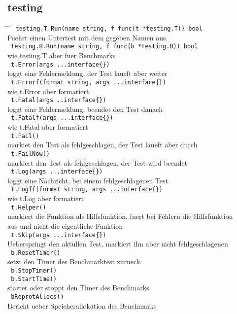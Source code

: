 \documentclass[twoside,a4paper,12pt]{article}
\begin{document}
\subsection{testing}
\begin{tabbing}
 \hspace{2mm} \= \hspace{70mm} \= \kill
 \> \verb| testing.T.Run(name string, f func(t *testing.T)) bool | \\ 
 \> Fuehrt einen Untertest mit dem gegeben Namen aus. \\ 
 \> \verb| testing.B.Run(name string, f func(b *testing.B)) bool | \\ 
 \> wie testing.T aber fuer Benchmarks \\ 
 \> \verb| t.Error(args ...interface{}) | \\ 
 \> loggt eine Fehlermeldung, der Test laueft aber weiter \\ 
 \> \verb| t.Errorf(format string, args ...interface{}) | \\ 
 \> wie t.Error aber formatiert \\ 
 \> \verb| t.Fatal(args ..interface{}) | \\ 
 \> loggt eine Fehlermeldung, beendet den Test danach \\ 
 \> \verb| t.Fatalf(args ...interface{}) | \\ 
 \> wie t.Fatal aber formatiert \\ 
 \> \verb| t.Fail() | \\ 
 \> markiet den Test als fehlgeschlagen, der Test laueft aber durch \\ 
 \> \verb| t.FailNow() | \\ 
 \> markiert den Test als fehlgeschlagen, der Test wird beendet \\ 
 \> \verb| t.Log(args ...interface{}) | \\ 
 \> loggt eine Nachricht, bei einem fehlgeschlagenen Test \\ 
 \> \verb| t.Logff(format string, args ...interface{}) | \\ 
 \> wie t.Log aber formatiert \\ 
 \> \verb| t.Helper() | \\ 
 \> markiert die Funktion als Hilfsfunktion, fuert bei Fehlern die Hilfsfunktion \\ 
 \> aus und nicht die eigentliche Funktion \\ 
 \> \verb| t.Skip(args ...interface{}) | \\ 
 \> Ueberspringt den aktullen Test, markiert ihn aber nicht fehlgeschlagenen \\ 
 \> \verb| b.ResetTimer() | \\ 
 \> setzt den Timer des Benchmarktest zurueck \\ 
 \> \verb| b.StopTimer() | \\ 
 \> \verb| b.StartTime() | \\ 
 \> startet oder stoppt den Timer des Benchmarks \\ 
 \> \verb| bReprotAllocs() | \\ 
 \> Bericht ueber Speicherallokation des Benchmarks \\ 
\end{tabbing}
\end{document}
